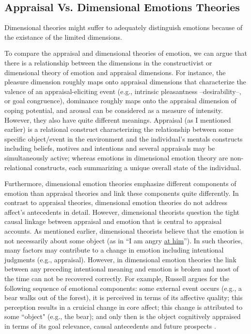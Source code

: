 \documentclass[11pt]{article}
\begin{document}
\subsection{Appraisal Vs. Dimensional Emotions Theories}

Dimensional theories might suffer to adequately distinguish emotions because
of the existance of the limited dimensions.

To compare the appraisal and dimensional theories of emotion, we can argue that
there is a relationship between the dimensions in the constructivist or
dimensional theory of emotion and appraisal dimensions. For instance, the
pleasure dimension roughly maps onto appraisal dimensions that characterize the
valence of an appraisal-eliciting event (e.g., intrinsic pleasantness
--desirability--, or goal congruence), dominance roughly maps onto the appraisal
dimension of coping potential, and arousal can be considered as a measure of
intensity. However, they also have quite different meanings. Appraisal (as I
mentioned earlier) is a relational construct characterizing the relationship
between some specific object/event in the environment and the individual's
mentals constructs including beliefs, motives and intentions and several
appraisals may be simultaneously active; whereas emotions in dimensional emotion
theory are non-relational constructs, each summarizing a unique overall state of
the individual.

Furthermore, dimensional emotion theories emphasize different components of
emotion than appraisal theories and link these components quite differently.
In contrast to appraisal theories, dimensional emotion theories do not address
affect’s antecedents in detail. However, dimensional theorists question the
tight causal linkage between appraisal and emotion that is central to appraisal
accounts. As mentioned earlier, dimensional theorists believe that the emotion
is not necessarily about some object (as in ``I am angry \underline{at him}'').
In such theories, many factors may contribute to a change in emotion including
intentional judgments (e.g., appraisal). However, in dimensional emotion
theories the link between any preceding intentional meaning and emotion is
broken and most of the time can not be recovered correctly. For example, Russell
argues for the following sequence of emotional components: some external event
occurs (e.g., a bear walks out of the forest), it is perceived in terms of its
affective quality; this perception results in a cruicial change in core affect;
this change is attributed to some ``object" (e.g., the bear); and only then is
the object cognitively appraised in terms of its goal relevance, causal
antecedents and future prospects \cite{marsella:computational-models}.
\end{document}
